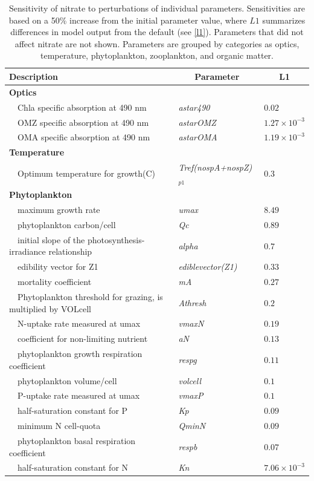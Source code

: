 \documentclass[letterpaper,12pt,oneside]{article}\usepackage[]{graphicx}\usepackage[]{color}
\begin{document}
\begin{table}[!tbp]
{\footnotesize
\caption{Sensitivity of nitrate to perturbations of individual parameters.  Sensitivities are based on a 50\% increase from the initial parameter value, where $L1$ summarizes differences in model output from the default (see \cref{l1}).  Parameters that did not affect nitrate are not shown.  Parameters are grouped by categories as optics, temperature, phytoplankton, zooplankton, and organic matter.\label{tab:no3sens}} 
\begin{center}
\begin{tabular}{lll}
\hline\hline
\multicolumn{1}{l}{Description}&\multicolumn{1}{c}{Parameter}&\multicolumn{1}{c}{L1}\tabularnewline
\hline
{\bfseries Optics}&&\tabularnewline
~~Chla specific absorption at 490 nm&\textit{astar490}&$0.02$\tabularnewline
~~OMZ specific absorption at 490 nm&\textit{astarOMZ}&$1.27\times 10^{-3}$\tabularnewline
~~OMA specific absorption at 490 nm&\textit{astarOMA}&$1.19\times 10^{-3}$\tabularnewline
\hline
{\bfseries Temperature}&&\tabularnewline
~~Optimum temperature for growth(C)&\textit{Tref(nospA+nospZ)$_{p1}$}&$0.3$\tabularnewline
\hline
{\bfseries Phytoplankton}&&\tabularnewline
~~maximum growth rate&\textit{umax}&$8.49$\tabularnewline
~~phytoplankton carbon/cell&\textit{Qc}&$0.89$\tabularnewline
~~initial slope of the photosynthesis-irradiance relationship&\textit{alpha}&$0.7$\tabularnewline
~~edibility vector for Z1&\textit{ediblevector(Z1)}&$0.33$\tabularnewline
~~mortality coefficient&\textit{mA}&$0.27$\tabularnewline
~~Phytoplankton threshold for grazing, is multiplied by VOLcell&\textit{Athresh}&$0.2$\tabularnewline
~~N-uptake rate measured at umax&\textit{vmaxN}&$0.19$\tabularnewline
~~coefficient for non-limiting nutrient&\textit{aN}&$0.13$\tabularnewline
~~phytoplankton growth respiration coefficient&\textit{respg}&$0.11$\tabularnewline
~~phytoplankton volume/cell&\textit{volcell}&$0.1$\tabularnewline
~~P-uptake rate measured at umax&\textit{vmaxP}&$0.1$\tabularnewline
~~half-saturation constant for P&\textit{Kp}&$0.09$\tabularnewline
~~minimum N cell-quota&\textit{QminN}&$0.09$\tabularnewline
~~phytoplankton basal respiration coefficient&\textit{respb}&$0.07$\tabularnewline
~~half-saturation constant for N&\textit{Kn}&$7.06\times 10^{-3}$\tabularnewline

\end{tabular}
\end{center}}
\end{table}
\end{document}
